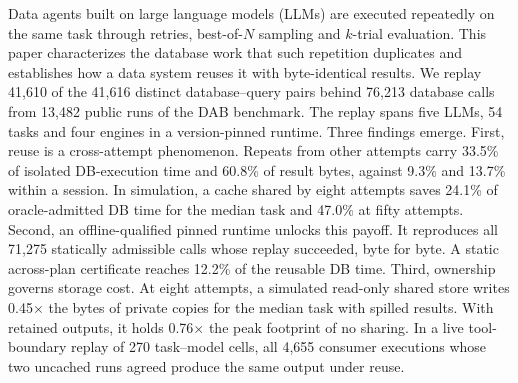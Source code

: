 Data agents built on large language models (LLMs) are executed repeatedly on the same task through retries,
best-of-$N$ sampling and $k$-trial evaluation. This paper characterizes the database work that such repetition
duplicates and establishes how a data system reuses it with byte-identical results. We replay 41,610 of the 41,616
distinct database--query pairs behind 76,213 database calls from 13,482 public runs of the DAB benchmark. The replay
spans five LLMs, 54 tasks and four engines in a version-pinned runtime. Three findings emerge. First, reuse is a
cross-attempt phenomenon. Repeats from other attempts carry 33.5\% of isolated DB-execution time and 60.8\% of result
bytes, against 9.3\% and 13.7\% within a session. In simulation, a cache shared by eight attempts saves 24.1\% of oracle-admitted DB time for the median task and 47.0\% at fifty attempts. Second, an offline-qualified pinned runtime unlocks this payoff.
It reproduces all 71,275 statically admissible calls whose replay succeeded, byte for byte. A static across-plan certificate reaches 12.2\% of the reusable DB time. Third, ownership governs storage cost. At eight attempts, a simulated read-only shared store writes 0.45$\times$ the bytes of private copies for the median task with spilled results. With retained outputs, it holds 0.76$\times$ the peak footprint of no sharing.
In a live tool-boundary replay of 270 task--model cells, all 4,655 consumer executions whose two uncached runs agreed produce the same output under reuse.

